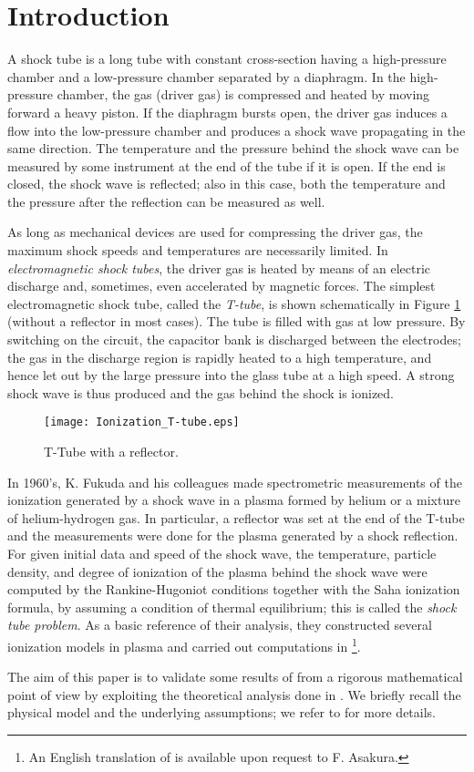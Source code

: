 \documentclass[10pt,a4paper]{article}
\numberwithin{equation}{section}
\begin{document}
\section{Introduction}
A shock tube is a long tube with constant cross-section having a high-pressure chamber and a low-pressure chamber separated by a diaphragm. In the high-pressure chamber, the gas (driver gas) is compressed and heated by moving forward a heavy piston. If the diaphragm bursts open, the driver gas induces a flow into the low-pressure chamber and produces a shock wave propagating in the same direction. The temperature and the pressure behind the shock wave can be measured by some instrument at the end of the tube if it is open. If the end is closed, the shock wave is reflected; also in this case, both the temperature and the pressure after the reflection can be measured as well.
\par
As long as mechanical devices are used for compressing the driver gas, the maximum shock speeds and temperatures are necessarily limited. In {\it electromagnetic shock tubes\/}, the driver gas is heated by means of an electric discharge and, sometimes, even accelerated by magnetic forces. The simplest electromagnetic shock tube, called the {\it T-tube\/}, is  shown schematically in Figure \ref{fig:T-tube} (without a reflector in most cases). The tube is filled with gas at low pressure. By switching on the circuit, the capacitor bank is discharged between the electrodes; the gas in the discharge region is rapidly heated to a high temperature, and hence let out by the large pressure into the glass tube at a high speed. A strong shock wave is thus produced and the gas behind the shock is ionized.  
%
\begin{figure}[hbt]
\centering
 \texttt{[image: Ionization\_T-tube.eps]}
 \caption{T-Tube with a reflector.}\label{fig:T-tube}
\end{figure}
\par
In 1960's, K. Fukuda and his colleagues made spectrometric measurements of the ionization generated by a shock wave in a plasma formed by helium or a mixture of helium-hydrogen gas. In particular, a reflector was set at the end of the T-tube and the measurements were done for the plasma generated by a shock reflection. For given initial data and speed of the shock wave, the temperature, particle density, and  degree of ionization of the plasma behind the shock wave were computed by the Rankine-Hugoniot conditions together with the Saha ionization formula, by assuming a condition of thermal equilibrium; this is called the {\it shock tube problem\/}.  As a basic reference of their analysis, they constructed several  ionization models in plasma and carried out computations in \cite{Fukuda-Okasaka-Fujimoto} \footnote{An English translation of \cite{Fukuda-Okasaka-Fujimoto} is available upon request to F. Asakura.}.
\par
The aim of this paper is to validate some results of \cite{Fukuda-Okasaka-Fujimoto} from a rigorous mathematical point of view by exploiting the theoretical analysis done in \cite{Asakura-Corli_RIMS, Asakura-Corli_ionized}. We briefly recall the physical model and the underlying assumptions; we refer to \cite{Asakura-Corli_ionized} for more details.
\end{document}
